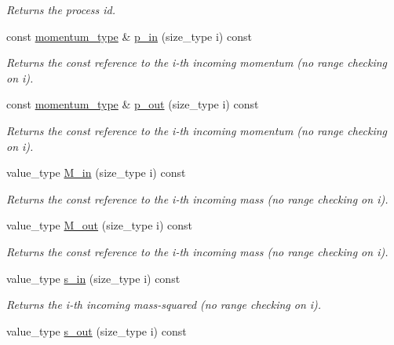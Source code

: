 \begin{DoxyCompactItemize}
\begin{DoxyCompactList}\small\item\em Returns the process id. \end{DoxyCompactList}\item 
const \hyperlink{a00579}{momentum\+\_\+type} \& \hyperlink{a00436_a0f2d060d8fcaf550dc549107de16a117}{p\+\_\+in} (size\+\_\+type i) const 
\begin{DoxyCompactList}\small\item\em Returns the const reference to the i-\/th incoming momentum (no range checking on i). \end{DoxyCompactList}\item 
const \hyperlink{a00579}{momentum\+\_\+type} \& \hyperlink{a00436_ac83c742399331e972df1be65c587940e}{p\+\_\+out} (size\+\_\+type i) const 
\begin{DoxyCompactList}\small\item\em Returns the const reference to the i-\/th incoming momentum (no range checking on i). \end{DoxyCompactList}\item 
value\+\_\+type \hyperlink{a00436_a49db45a3fa01af92dab21cecce0934e7}{M\+\_\+in} (size\+\_\+type i) const 
\begin{DoxyCompactList}\small\item\em Returns the const reference to the i-\/th incoming mass (no range checking on i). \end{DoxyCompactList}\item 
value\+\_\+type \hyperlink{a00436_ac7725a8b3a39b0313e117613e9716337}{M\+\_\+out} (size\+\_\+type i) const 
\begin{DoxyCompactList}\small\item\em Returns the const reference to the i-\/th incoming mass (no range checking on i). \end{DoxyCompactList}\item 
\hypertarget{a00436_a16d207fe275c80737368224ac03b0284}{}value\+\_\+type \hyperlink{a00436_a16d207fe275c80737368224ac03b0284}{s\+\_\+in} (size\+\_\+type i) const \label{a00436_a16d207fe275c80737368224ac03b0284}

\begin{DoxyCompactList}\small\item\em Returns the i-\/th incoming mass-\/squared (no range checking on i). \end{DoxyCompactList}\item 
\hypertarget{a00436_a2ed990d63db381ee1b2bedbe00dd56bf}{}value\+\_\+type \hyperlink{a00436_a2ed990d63db381ee1b2bedbe00dd56bf}{s\+\_\+out} (size\+\_\+type i) const \label{a00436_a2ed990d63db381ee1b2bedbe00dd56bf}


\end{DoxyCompactItemize}
